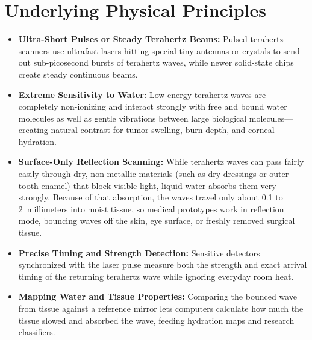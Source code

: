 \section{Underlying Physical Principles}
\begin{itemize}
  \item \textbf{Ultra-Short Pulses or Steady Terahertz Beams:} Pulsed terahertz scanners use ultrafast lasers hitting special tiny antennas or crystals to send out sub-picosecond bursts of terahertz waves, while newer solid-state chips create steady continuous beams.
  \item \textbf{Extreme Sensitivity to Water:} Low-energy terahertz waves are completely non-ionizing and interact strongly with free and bound water molecules as well as gentle vibrations between large biological molecules---creating natural contrast for tumor swelling, burn depth, and corneal hydration.
  \item \textbf{Surface-Only Reflection Scanning:} While terahertz waves can pass fairly easily through dry, non-metallic materials (such as dry dressings or outer tooth enamel) that block visible light, liquid water absorbs them very strongly. Because of that absorption, the waves travel only about 0.1 to 2~millimeters into moist tissue, so medical prototypes work in reflection mode, bouncing waves off the skin, eye surface, or freshly removed surgical tissue.
  \item \textbf{Precise Timing and Strength Detection:} Sensitive detectors synchronized with the laser pulse measure both the strength and exact arrival timing of the returning terahertz wave while ignoring everyday room heat.
  \item \textbf{Mapping Water and Tissue Properties:} Comparing the bounced wave from tissue against a reference mirror lets computers calculate how much the tissue slowed and absorbed the wave, feeding hydration maps and research classifiers.
\end{itemize}


